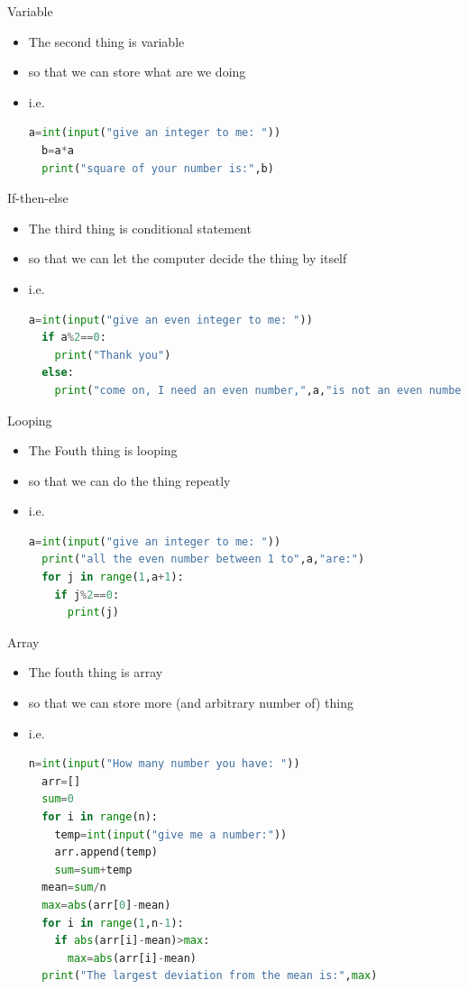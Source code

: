 \documentclass[10pt,xcolor={table,dvipsnames},t]{beamer}
\begin{document}
\begin{frame}[fragile]{Variable}
  \begin{itemize}
    \item The second thing is variable
    \item so that we can store what are we doing
    \item i.e.
\begin{lstlisting}[language=python]
  a=int(input("give an integer to me: "))
  b=a*a
  print("square of your number is:",b)
\end{lstlisting}
  \end{itemize}
\end{frame}

\begin{frame}[fragile]{If-then-else}
  \begin{itemize}
    \item The third thing is conditional statement
    \item so that we can let the computer decide the thing by itself
    \item i.e.
\begin{lstlisting}[language=python]
  a=int(input("give an even integer to me: "))
  if a%2==0:
    print("Thank you")
  else:
    print("come on, I need an even number,",a,"is not an even number")
\end{lstlisting}
  \end{itemize}
\end{frame}

\begin{frame}[fragile]{Looping}
  \begin{itemize}
    \item The Fouth thing is looping
    \item so that we can do the thing repeatly
    \item i.e.
\begin{lstlisting}[language=python]
  a=int(input("give an integer to me: "))
  print("all the even number between 1 to",a,"are:")
  for j in range(1,a+1):
    if j%2==0:
      print(j)
\end{lstlisting}
  \end{itemize}
\end{frame}

\begin{frame}[fragile]{Array}
  \begin{itemize}
    \item The fouth thing is array
    \item so that we can store more (and arbitrary number of) thing
    \item i.e.
\begin{lstlisting}[language=python]
  n=int(input("How many number you have: "))
  arr=[]
  sum=0
  for i in range(n):
    temp=int(input("give me a number:"))
    arr.append(temp)
    sum=sum+temp
  mean=sum/n
  max=abs(arr[0]-mean)
  for i in range(1,n-1):
    if abs(arr[i]-mean)>max:
      max=abs(arr[i]-mean)
  print("The largest deviation from the mean is:",max)
\end{lstlisting}
  \end{itemize}
\end{frame}
\end{document}
